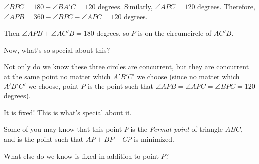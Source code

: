 


$\angle BPC = 180 - \angle BA'C = 120$ degrees. Similarly, $\angle APC = 120$ degrees. Therefore, $\angle APB = 360 - \angle BPC - \angle APC = 120$ degrees.

Then $\angle APB + \angle AC'B = 180$ degrees, so $P$ is on the circumcircle of $AC'B.$

Now, what's so special about this?


Not only do we know these three circles are concurrent, but they are concurrent at the same point no matter which $A'B'C'$ we choose (since no matter which $A'B'C'$ we choose, point $P$ is the point such that $\angle APB = \angle APC = \angle BPC = 120$ degrees).

It is fixed! This is what's special about it.


\begin{note}
    Some of you may know that this point $P$ is the \emph{Fermat point} of triangle $ABC,$ and is the point such that $AP + BP + CP$ is minimized.    
\end{note}

What else do we know is fixed in addition to point $P$?


